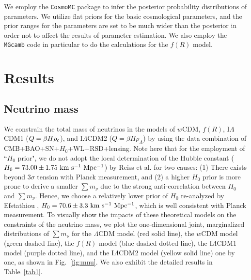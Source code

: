 \documentclass[aps,prd,nofootinbib,amsmath,amssymb,twocolumn,superscriptaddress,10pt]{revtex4}%
\begin{document}
We employ the {\tt CosmoMC} package \cite{Lewis:2002ah} to infer the posterior probability distributions of parameters. {We utilize flat priors for the basic cosmological parameters, and the prior ranges for the parameters are set to be much wider than the posterior in order not to affect the results of parameter estimation.}  We also employ the {\tt MGcamb} code \cite{Lewis:1999bs,Hojjati:2011ix} {in particular} to do the calculations for the $f(R)$ model. 




\section{Results}\label{sec:results}


\subsection{Neutrino mass}

We constrain the total mass of neutrinos in the models of $w$CDM, $f(R)$, I$\Lambda$CDM1 ($Q=\beta H\rho_{\rm c}$), and I$\Lambda$CDM2 ($Q=\beta H\rho_{\Lambda}$) by using the data combination of CMB+BAO+SN+$H_{0}$+WL+RSD+lensing. {Note here that for the employment of ``$H_{0}$ prior", we do not adopt the local determination of the Hubble constant ($H_{0}=73.00\pm1.75 ~\rm km  ~s^{-1} ~Mpc^{-1}$) by Reiss {et al}. \cite{Riess:2016jrr} for two causes: (1) There exists beyond $3\sigma$ tension with Planck measurement, and (2) a higher $H_{0}$ prior is more prone to derive a smaller $\sum m_{\nu}$ due to the strong anti-correlation between $H_{0}$ and $\sum m_{\nu}$. Hence, we choose a relatively lower prior of $H_{0}$ re-analyzed by Efstathiou \cite{Efstathiou:2013via}, $H_{0}=70.6\pm3.3 ~\rm km  ~s^{-1} ~Mpc^{-1}$, which is well consistent with Planck measurement. To visually show the impacts of these theoretical models on the constraints of the neutrino mass, we plot the one-dimensional joint, marginalized distributions of $\sum m_{\nu}$ for the $\Lambda$CDM model (red solid line), the $w$CDM model (green dashed line), the $f(R)$ model (blue dashed-dotted line), the I$\Lambda$CDM1 model (purple dotted line), and the I$\Lambda$CDM2 model (yellow solid line) one by one, as shown in Fig.~\ref{fig:mnu}. We also exhibit the detailed results in Table~\ref{tab1}.}
\end{document}
